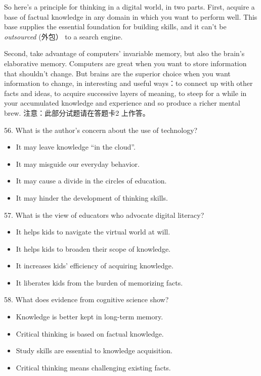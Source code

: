 \documentclass[UTF8,11pt]{ctexart}
\begin{document}
So here’s a principle for thinking in a digital world, in two parts. First, acquire a base of factual knowledge in any domain in which you want to perform well. This base supplies the essential foundation for building skills, and it can’t be\textit{ outsourced} (外包） to a search engine.


Second, take advantage of computers’ invariable memory, but also the brain’s elaborative memory. Computers are great when you want to store information that shouldn’t change. But brains are the superior choice when you want information to change, in interesting and useful ways：to connect up with other facts and ideas, to acquire successive layers of meaning, to steep for a while in your accumulated knowledge and experience and so produce a richer mental brew. 注意：此部分试题请在答题卡2 上作答。


56. What is the author’s concern about the use of technology?


\begin{itemize}[leftmargin=2em,itemsep=.2em,topsep=.4em]\item[A.] It may leave knowledge “in the cloud”.
\item[B.] It may misguide our everyday behavior.
\item[C.] It may cause a divide in the circles of education.
\item[D.] It may hinder the development of thinking skills.
\end{itemize}

57. What is the view of educators who advocate digital literacy?


\begin{itemize}[leftmargin=2em,itemsep=.2em,topsep=.4em]\item[A.] It helps kids to navigate the virtual world at will.
\item[B.] It helps kids to broaden their scope of knowledge.
\item[C.] It increases kids’ efficiency of acquiring knowledge.
\item[D.] It liberates kids from the burden of memorizing facts.
\end{itemize}

58. What does evidence from cognitive science show?


\begin{itemize}[leftmargin=2em,itemsep=.2em,topsep=.4em]\item[A.] Knowledge is better kept in long-term memory.
\item[B.] Critical thinking is based on factual knowledge.
\item[C.] Study skills are essential to knowledge acquisition.
\item[D.] Critical thinking means challenging existing facts.
\end{itemize}
\end{document}
